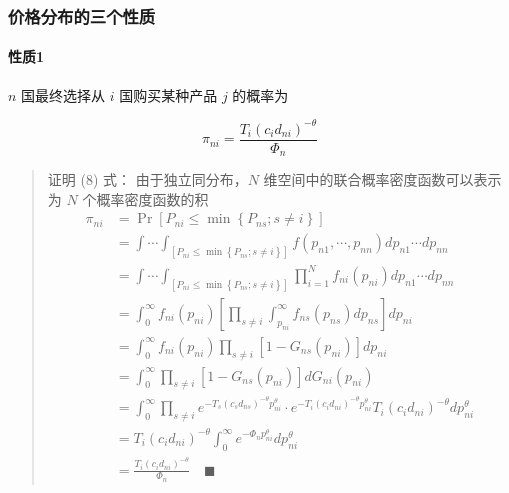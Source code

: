 \documentclass[
]{article}
\begin{document}
\hypertarget{ux4ef7ux683cux5206ux5e03ux7684ux4e09ux4e2aux6027ux8d28}{%
\subsubsection{价格分布的三个性质}\label{ux4ef7ux683cux5206ux5e03ux7684ux4e09ux4e2aux6027ux8d28}}

\hypertarget{ux6027ux8d281}{%
\paragraph{性质1}\label{ux6027ux8d281}}

\(n\) 国最终选择从 \(i\) 国购买某种产品 \(j\) 的概率为

\[
\pi_{n i}=\frac{T_{i}\left(c_{i} d_{n i}\right)^{-\theta}}{\Phi_{n}} \tag{8}
\]

\begin{quote}
证明 (8) 式： 由于独立同分布，\(N\) 维空间中的联合概率密度函数可以表示为
\(N\) 个概率密度函数的积\[\begin{aligned}
\pi_{n i}&=\operatorname{Pr}\left[P_{n i} \leq \min \left\{P_{n s}; s \neq i\right\}\right] \\ 
&=\int\cdots\int_{\left[P_{n i} \leq \min \left\{P_{n s}; s \neq i\right\}\right]}{ f(p_{n 1}, \cdots ,p_{n n}) d p_{n 1} \cdots d p_{n n}}\\
&=\int\cdots\int_{\left[P_{n i} \leq \min \left\{P_{n s}; s \neq i\right\}\right]}{ \prod_{i=1}^{N}f_{ni}(p_{ni})d p_{n 1} \cdots d p_{n n}}\\
&={\int_{0}^{\infty} f_{n i}(p_{ni})\left[\prod_{s \neq i} \int_{p_{ni}}^{\infty}f_{n s}(p_{ns}) d p_{n s}\right] d p_{ni}}\\
&={\int_{0}^{\infty} f_{n i}(p_{ni})\prod_{s \neq i} \left [1 - G_{n s}(p_{ni})\right] dp_{ni}} \\
&=\int_{0}^{\infty} \prod_{s \neq i}\left[1-G_{n s}(p_{ni})\right] d G_{ni}(p_{ni}) \\ 
&=\int_{0}^{\infty} \prod_{s \neq i}e^{ -T_{s}\left(c_{s} d_{n s}\right)^{-\theta} p_{ni}^{\theta}} \cdot e^{ -T_{i}\left(c_{i} d_{n i}\right)^{-\theta} p_{ni}^{\theta}} T_{i}\left(c_{i} d_{n i}\right)^{-\theta} d p_{ni}^{\theta}\\
&=T_{i}\left(c_{i} d_{n i}\right)^{-\theta}\int_{0}^{\infty} e^{ -\Phi_n p_{ni}^{\theta}}  d p_{ni}^{\theta}\\
&=\frac{T_{i}\left(c_{i} d_{n i}\right)^{-\theta}}{\Phi_{n}} \quad \blacksquare \end{aligned}\]
\end{quote}
\end{document}
